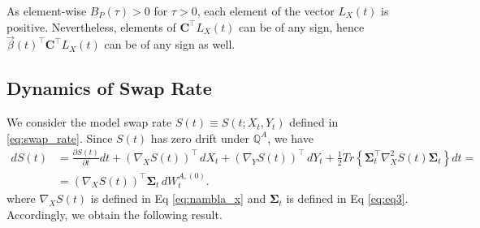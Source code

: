 \documentclass[pdftex,11pt,a4paper] {article}
\newtheorem{proposition}{Proposition}[section]
\begin{document}



As element-wise $B_P(\tau)>0$ for $\tau>0$, each element of the vector $L_X(t)$ is positive. Nevertheless, elements of  $\mathbf{C}^\top L_X(t)$ can be of any sign, hence $\vec{\beta}(t)^\top \mathbf{C}^\top L_X(t)$ can be of any sign as well. %





\subsection{Dynamics of Swap Rate}


We consider the model swap rate $S(t)\equiv S(t; X_t, Y_t)$ defined in \eqref{eq:swap_rate}. Since $S(t)$ has zero drift under $\mathbb{Q}^A$, we have
\begin{equation}\label{eq:sde_annuity3}
\begin{split}
dS(t)&=\frac{\partial S(t)}{\partial t}dt+\left(\nabla_X S(t)\right)^\top\,dX_t+\left(\nabla_Y S(t)\right)^\top\,dY_t+\frac{1}{2}Tr\left\{\mathbf{\Sigma}_{t}^\top\nabla_X^2 S(t) \mathbf{\Sigma}_{t}\right\}dt=\\
&=\left(\nabla_X S(t)\right)^\top\mathbf{\Sigma}_{t}\, dW^{A,(0)}_t.
\end{split}
\end{equation} 
where $\nabla_X S(t)$ is defined in Eq \eqref{eq:nambla_x} and $\mathbf{\Sigma}_{t}$ is defined in Eq \eqref{eq:eq3}. Accordingly, we obtain the following result.
\end{document}
